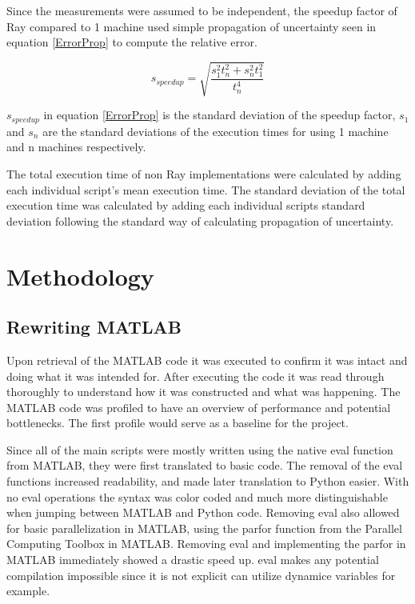 \documentclass[12pt, a4paper]{article}
\begin{document}
Since the measurements were assumed to be independent, the speedup factor of Ray compared to 1 machine used simple propagation of uncertainty seen in equation \eqref{ErrorProp} to compute the relative error.

\begin{equation}\label{ErrorProp}
    s_{speedup} = \sqrt{\frac{s_{1}^2t_n^2 + s_{n}^2t_1^2}{t_n^4}}
\end{equation}

$s_{speedup}$ in equation \eqref{ErrorProp} is the standard deviation of the speedup factor, $s_1$ and $s_n$ are the standard deviations of the execution times for using 1 machine and n machines respectively.

The total execution time of non Ray implementations were calculated by adding each individual script's mean execution time.
The standard deviation of the total execution time was calculated by adding each individual scripts standard deviation following the standard way of calculating propagation of uncertainty.

\section{Methodology}

\subsection{Rewriting MATLAB}

Upon retrieval of the MATLAB code it was executed to confirm it was intact and doing what it was intended for. 
After executing the code it was read through thoroughly to understand how it was constructed and what was happening.
The MATLAB code was profiled to have an overview of performance and potential bottlenecks.
The first profile would serve as a baseline for the project.

Since all of the main scripts were mostly written using the native eval function from MATLAB, they were first translated to basic code. 
The removal of the eval functions increased readability, and made later translation to Python easier. With no eval operations the syntax was color coded and much more distinguishable when jumping between MATLAB and Python code.
Removing eval also allowed for basic parallelization in MATLAB, using the parfor function from the Parallel Computing Toolbox in MATLAB.
Removing eval and implementing the parfor in MATLAB immediately showed a drastic speed up. 
eval makes any potential compilation impossible since it is not explicit can utilize dynamice variables for example.
\end{document}
